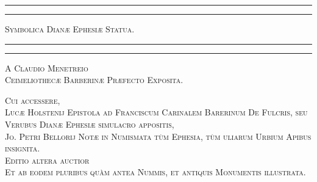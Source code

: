 \documentclass[a4paper, 11pt, oneside, polutonikogreek, latin]{article}
\begin{document}
\begin{titlepage} %
	\centering %

	
	\rule{\textwidth}{1.6pt}\vspace*{-\baselineskip}\vspace*{2pt} %
	\rule{\textwidth}{0.4pt} %
	
	\vspace{1\baselineskip} %
	
	{\scshape\Huge Symbolica Dianæ Ephesiæ Statua.}
	
	\vspace{1\baselineskip} %

	\rule{\textwidth}{0.4pt}\vspace*{-\baselineskip}\vspace{3.2pt} %
	\rule{\textwidth}{1.6pt} %
	
	\vspace{1\baselineskip} %
	
	
	{\scshape \Large A Claudio Menetreio\\Ceimeliothecæ Barberinæ Præfecto Exposita.} %
	
	\vspace*{1\baselineskip} %
	
{\scshape Cui accessere,\\Lucæ Holstenij Epistola ad Franciscum Carinalem Barerinum De Fulcris, seu Verubus Dianæ Ephesiæ simulacro appositis,\\Jo. Petri Bellorij Notæ in Numismata tùm Ephesia, tùm uliarum Urbium Apibus insignita.\\\vspace*{10mm}\small Editio altera auctior\\Et ab eodem pluribus quàm antea Nummis, et antiquis Monumentis illustrata.} %

\vspace*{\fill}


\end{titlepage}
\end{document}

